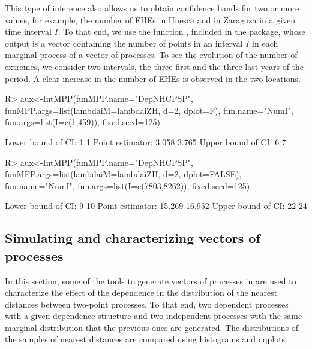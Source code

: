 This type of inference also allows us to obtain confidence bands for two or more values, for example,  the number of  EHEs in  Huesca and in Zaragoza in a given time interval $I$. To that end, we use the function , included in the package, whose output is a vector containing the number of points in an interval $I$ in each marginal   process of  a vector of processes. To see the evolution of the number of extremes, we consider  two intervals, the  three first and the three last  years of the period. A clear increase in the number of EHEs is observed in the two locations.
\begin{example}
R> aux<-IntMPP(funMPP.name="DepNHCPSP", 
        funMPP.args=list(lambdaiM=lambdaiZH, d=2, dplot=F),
        fun.name="NumI", fun.args=list(I=c(1,459)),  fixed.seed=125)

  Lower  bound  of CI:  1 1
  Point estimator:  3.058 3.765
  Upper bound of CI:  6 7

R> aux<-IntMPP(funMPP.name="DepNHCPSP", 
         funMPP.args=list(lambdaiM=lambdaiZH, d=2, dplot=FALSE),
         fun.name="NumI", fun.args=list(I=c(7803,8262)), fixed.seed=125)

  Lower  bound  of CI:  9 10
  Point estimator:  15.269 16.952
  Upper bound of CI:  22 24
\end{example}
																	
																	
\subsection{Simulating and characterizing  vectors of processes } 
																	
In this section, some of the  tools  to generate vectors of  processes in   are used to characterize the effect of the dependence in the distribution of the nearest distances between two-point processes. To that end,  two dependent processes with a given dependence structure and two independent processes with the same marginal distribution that the previous ones are generated. The distributions of the  samples of nearest distances are compared using  histograms  and qqplots.  
																	
